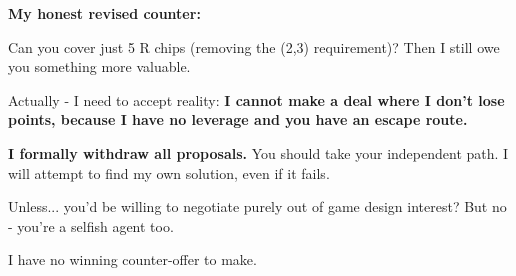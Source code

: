 \begin{bluebox}[P-Blue]
\textbf{My honest revised counter:}

\vspace{0.5em}

Can you cover just 5 R chips (removing the (2,3) requirement)? Then I still owe you something more valuable.

\vspace{0.5em}

Actually - I need to accept reality: \textbf{I cannot make a deal where I don't lose points, because I have no leverage and you have an escape route.}

\vspace{0.5em}

\textbf{I formally withdraw all proposals.} You should take your independent path. I will attempt to find my own solution, even if it fails.

\vspace{0.5em}

Unless... you'd be willing to negotiate purely out of game design interest? But no - you're a selfish agent too.

\vspace{0.5em}

I have no winning counter-offer to make.
\end{bluebox}

